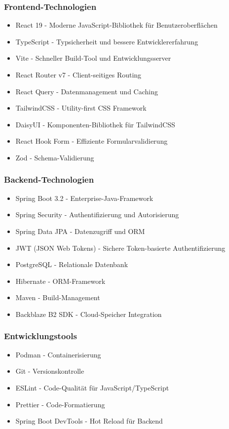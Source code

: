 \documentclass[a4paper,12pt]{article}
\begin{document}
\subsubsection{Frontend-Technologien}
\begin{itemize}
    \item React 19 - Moderne JavaScript-Bibliothek für Benutzeroberflächen
    \item TypeScript - Typsicherheit und bessere Entwicklererfahrung
    \item Vite - Schneller Build-Tool und Entwicklungsserver
    \item React Router v7 - Client-seitiges Routing
    \item React Query - Datenmanagement und Caching
    \item TailwindCSS - Utility-first CSS Framework
    \item DaisyUI - Komponenten-Bibliothek für TailwindCSS
    \item React Hook Form - Effiziente Formularvalidierung
    \item Zod - Schema-Validierung
\end{itemize}

\subsubsection{Backend-Technologien}
\begin{itemize}
    \item Spring Boot 3.2 - Enterprise-Java-Framework
    \item Spring Security - Authentifizierung und Autorisierung
    \item Spring Data JPA - Datenzugriff und ORM
    \item JWT (JSON Web Tokens) - Sichere Token-basierte Authentifizierung
    \item PostgreSQL - Relationale Datenbank
    \item Hibernate - ORM-Framework
    \item Maven - Build-Management
    \item Backblaze B2 SDK - Cloud-Speicher Integration
\end{itemize}

\subsubsection{Entwicklungstools}
\begin{itemize}
    \item Podman - Containerisierung
    \item Git - Versionskontrolle
    \item ESLint - Code-Qualität für JavaScript/TypeScript
    \item Prettier - Code-Formatierung
    \item Spring Boot DevTools - Hot Reload für Backend
\end{itemize}
\end{document}
